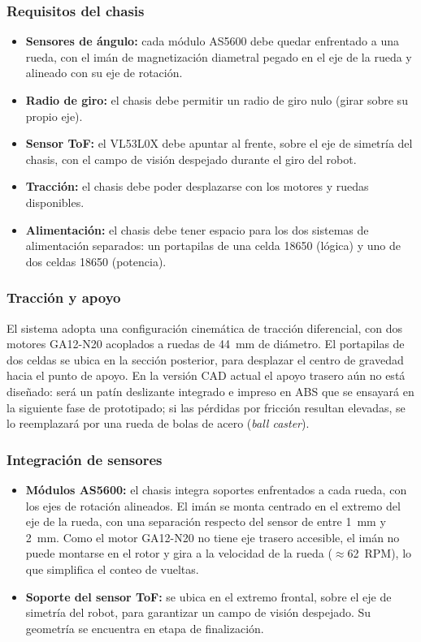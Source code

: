 \subsubsection{Requisitos del chasis}

\begin{itemize}[nosep]
    \item \textbf{Sensores de ángulo:} cada módulo AS5600 debe quedar enfrentado a una rueda, con el imán de magnetización diametral pegado en el eje de la rueda y alineado con su eje de rotación.
    \item \textbf{Radio de giro:} el chasis debe permitir un radio de giro nulo (girar sobre su propio eje).
    \item \textbf{Sensor ToF:} el VL53L0X debe apuntar al frente, sobre el eje de simetría del chasis, con el campo de visión despejado durante el giro del robot.
    \item \textbf{Tracción:} el chasis debe poder desplazarse con los motores y ruedas disponibles.
    \item \textbf{Alimentación:} el chasis debe tener espacio para los dos sistemas de alimentación separados: un portapilas de una celda 18650 (lógica) y uno de dos celdas 18650 (potencia).
\end{itemize}

\subsubsection{Tracción y apoyo}
El sistema adopta una configuración cinemática de tracción diferencial, con dos motores GA12-N20 acoplados a ruedas de \SI{44}{mm} de diámetro. El portapilas de dos celdas se ubica en la sección posterior, para desplazar el centro de gravedad hacia el punto de apoyo. En la versión CAD actual el apoyo trasero aún no está diseñado: será un patín deslizante integrado e impreso en ABS que se ensayará en la siguiente fase de prototipado; si las pérdidas por fricción resultan elevadas, se lo reemplazará por una rueda de bolas de acero (\emph{ball caster}).

\subsubsection{Integración de sensores}
\begin{itemize}[nosep]
    \item \textbf{Módulos AS5600:} el chasis integra soportes enfrentados a cada rueda, con los ejes de rotación alineados. El imán se monta centrado en el extremo del eje de la rueda, con una separación respecto del sensor de entre \SI{1}{mm} y \SI{2}{mm}. Como el motor GA12-N20 no tiene eje trasero accesible, el imán no puede montarse en el rotor y gira a la velocidad de la rueda ($\approx$\SI{62}{RPM}), lo que simplifica el conteo de vueltas.
    \item \textbf{Soporte del sensor ToF:} se ubica en el extremo frontal, sobre el eje de simetría del robot, para garantizar un campo de visión despejado. Su geometría se encuentra en etapa de finalización.
\end{itemize}


